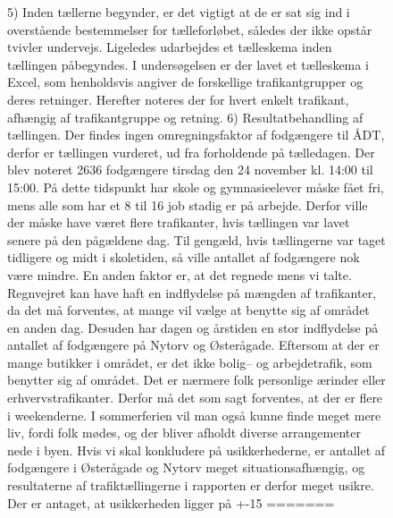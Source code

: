 \begin{figure}[htbp]
5) Inden tællerne begynder, er det vigtigt at de er sat sig ind i overstående bestemmelser for tælleforløbet, således der ikke opstår tvivler undervejs. Ligeledes udarbejdes et tælleskema inden tællingen påbegyndes. I undersøgelsen er der lavet et tælleskema i Excel, som henholdsvis angiver de forskellige trafikantgrupper og deres retninger. Herefter noteres der for hvert enkelt trafikant, afhængig af trafikantgruppe og retning.
6) Resultatbehandling af tællingen.
Der findes ingen omregningsfaktor af fodgængere til ÅDT, derfor er tællingen vurderet, ud fra forholdende på tælledagen. Der blev noteret 2636 fodgængere tirsdag den 24 november kl. 14:00 til 15:00. På dette tidspunkt har skole og gymnasieelever måske fået fri, mens alle som har et 8 til 16 job stadig er på arbejde. Derfor ville der måske have været flere trafikanter, hvis tællingen var lavet senere på den pågældene dag. Til gengæld, hvis tællingerne var taget tidligere og midt i skoletiden, så ville antallet af fodgængere nok være mindre. En anden faktor er, at det regnede mens vi talte. Regnvejret kan have haft en indflydelse på mængden af trafikanter, da det må forventes, at mange vil vælge at benytte sig af området en anden dag. Desuden har dagen og årstiden en stor indflydelse på antallet af fodgængere på Nytorv og Østerågade. Eftersom at der er mange butikker i området, er det ikke bolig– og arbejdetrafik, som benytter sig af området. Det er nærmere folk personlige ærinder eller erhvervstrafikanter. Derfor må det som sagt forventes, at der er flere i weekenderne. I sommerferien vil man også kunne finde meget mere liv, fordi folk mødes, og der bliver afholdt diverse arrangementer nede i byen. Hvis vi skal konkludere på usikkerhederne, er antallet af fodgængere i Østerågade og Nytorv meget situationsafhængig, og resultaterne af trafiktællingerne i rapporten er derfor meget usikre. Der er antaget, at usikkerheden ligger på +-15%
=======

\end{figure}
